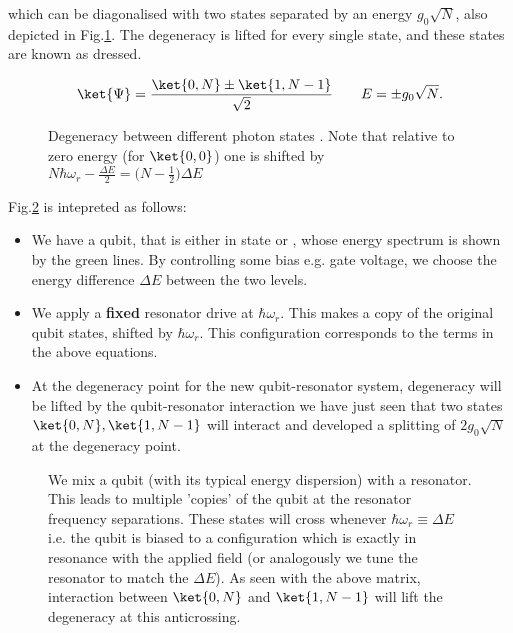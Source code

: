 \noindent  which  can  be   diagonalised  with  two  states
separated by  an energy $  g_0\sqrt{N} $, also  depicted in
Fig.\ref{qrLevel}.   The  degeneracy  is lifted  for  every
single state, and these states are known as dressed.

\begin{equation}
  \ket{\Psi} = \frac{\ket{0,N}\pm\ket{1,N-1}}{\sqrt{2}} \qquad E = \pm{g_0\sqrt{N}}.
\end{equation}

\begin{figure}
  \caption{Degeneracy     between      different     photon
    states  \label{qrLevel}.  Note  that  relative to  zero
    energy  (for   $  \ket{0,0}   $)  one  is   shifted  by
    $ N\hbar\omega_r-\frac{\Delta E}{2}=\bigg(N-\frac{1}{2}\bigg)\Delta E $}
\end{figure}

Fig.\ref{qrDresssed} is intepreted as follows:

\begin{itemize}
\item We have a qubit, that  is either in state  or
  ,  whose energy  spectrum is  shown by  the green
  lines.  By  controlling some  bias e.g. gate  voltage, we
  choose  the energy  difference $  \Delta E  $ between  the two
  levels.
\item  We   apply  a  \textbf{fixed}  resonator   drive  at
  $  \hbar\omega_r $.   This  makes  a copy  of  the original  qubit
  states,  shifted   by  $  \hbar\omega_r  $.    This  configuration
  corresponds  to  the     terms  in  the  above
  equations.
\item At  the degeneracy point for  the new qubit-resonator
  system, degeneracy will be  lifted by the qubit-resonator
  interaction  \ra  we  have  just  seen  that  two  states
  $ \ket{0,N}, \ket{1,N-1} $  will interact and developed a
  splitting of  $ 2g_0\sqrt{N}  $ at the  degeneracy point.
\end{itemize}

\begin{figure}[h]
  \caption{We  mix   a  qubit  (with  its   typical  energy
    dispersion) with  a resonator.  This leads  to multiple
    'copies'  of  the  qubit  at  the  resonator  frequency
    separations.    These   states  will   cross   whenever
    $  \hbar\omega_r\equiv\Delta  E   $  i.e.   the  qubit  is   biased  to  a
    configuration which  is exactly  in resonance  with the
    applied field (or analogously  we tune the resonator to
    match the  $ \Delta E  $).  As  seen with the  above matrix,
    interaction  between $\ket{0,N}$  and  $ \ket{1,N-1}  $
    will      lift     the      degeneracy     at      this
    anticrossing.\label{qrDresssed}}
\end{figure}

